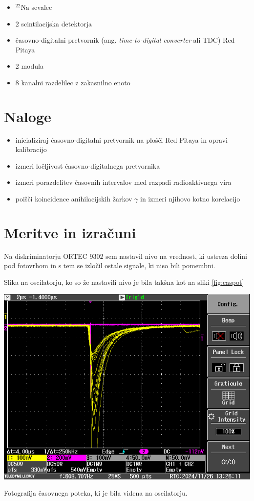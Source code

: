 \documentclass[11pt]{article}
\begin{document}
\begin{itemize}
\item \(^{22} \mathrm{Na}\) sevalec
\item 2 scintilacijska detektorja
\item časovno-digitalni pretvornik (ang. \emph{time-to-digital converter} ali TDC) Red Pitaya
\item 2 modula
\item 8 kanalni razdelilec z zakasnilno enoto
\end{itemize}

\section{Naloge}\label{sec:orge32db56}

\begin{itemize}
\item inicializiraj časovno-digitalni pretvornik na plošči Red Pitaya in opravi kalibracijo
\item izmeri ločljivost časovno-digitalnega pretvornika
\item izmeri porazdelitev časovnih intervalov med razpadi radioaktivnega vira
\item poišči koincidence anihilacijskih žarkov \(\gamma\) in izmeri njihovo kotno korelacijo
\end{itemize}

\section{Meritve in izračuni}\label{sec:org032569d}

Na diskriminatorju ORTEC 9302 sem nastavil nivo na vrednost, ki ustreza dolini pod fotovrhom in s tem se izločil ostale signale, ki niso bili pomembni.

Slika na oscilatorju, ko so že nastavili nivo je bila takšna kot na sliki \ref{fig:caspot}

\begin{slika}[H]
  \centering
  \includegraphics[width=.9\linewidth]{figures/casovni_potek.png}
  \caption{\small Fotografija časovnega poteka, ki je bila videna na oscilatorju.}\label{fig:caspot}
\end{slika}
\end{document}
